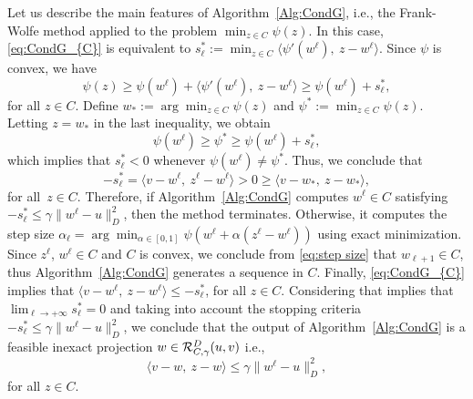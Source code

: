 Let us  describe the main features of  Algorithm~\ref{Alg:CondG}, i.e.,  the  Frank-Wolfe method applied to the problem $\min_{z \in C}\psi(z)$.   In this case,  \eqref{eq:CondG_{C}} is equivalent to $s_{\ell}^*:=\min_{z \in C}\langle \psi'(w^\ell) ,~z-w^\ell\rangle$. Since $\psi$ is convex, we have
$$
	\psi(z)\geq \psi(w^\ell) + \langle \psi'(w^\ell) ,~z-w^\ell\rangle\geq    \psi(w^\ell)  +   s_{\ell}^*,
$$
for all $z\in C$. Define  $ w_*:=\arg \min_{z \in C}\psi(z)$ and  $\psi^*:= \min_{z \in C}\psi(z)$. Letting $z= w_*$ in the last inequality,  we obtain $$\psi(w^\ell)\geq \psi^* \geq \psi(w^\ell)  +   s_{\ell}^*,$$ which implies that $s_{\ell}^*< 0$ whenever $\psi(w^\ell)\neq \psi^*$. Thus, we conclude that
$$
	-s_{\ell}^*=\langle  v-w^\ell, ~z^\ell-w^\ell \rangle>0\geq  \langle  v-w_*, ~z-w_* \rangle,
$$
for all~$z\in C$.   Therefore, if  Algorithm~\ref{Alg:CondG} computes  $w^\ell \in C$ satisfying $-s_{\ell}^*\leq  \gamma \|w^{\ell}-u\|_{D}^2$, then the method terminates. Otherwise, it computes the step size $\alpha_\ell = \arg\min_{\alpha \in [0,1]} \psi(w^\ell + \alpha(z^\ell - w^\ell))$  using exact minimization.  Since $z^\ell$, $w^\ell \in C$  and $C$ is convex, we conclude from  \eqref{eq:step size}  that $w_{\ell+1} \in C$, thus  Algorithm~\ref{Alg:CondG}  generates a sequence in $C$.  Finally,   \eqref{eq:CondG_{C}} implies that  $\langle  v-w^\ell, ~z-w^\ell\rangle\leq -s_{\ell}^*$, for all  $ z\in C$.  Considering that   \cite[Proposition A.2]{BeckTeboulle2004}  implies that $\lim_{\ell \to +\infty}s_{\ell}^*=0$ and taking into account   the  stopping criteria     $-s_{\ell}^*\leq \gamma \|w^{\ell}-u\|_{D}^2$, we conclude that the output of  Algorithm~\ref{Alg:CondG} is  a feasible inexact projection $w\in {\cal R}_{C, \gamma}^{D}(u,v)$ i.e.,   $$\langle  v-w, ~z-w\rangle\leq   \gamma \|w^{\ell}-u\|_{D}^2,$$ for all $z\in C$.


